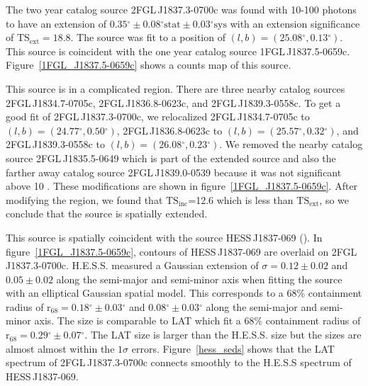\documentclass[12pt,preprint]{aastex}
\newcommand{\gev}{\text{GeV}\xspace}
\newcommand{\tev}{\text{TeV}\xspace}
\newcommand{\tsext}{{\ensuremath{\text{TS}_{\text{ext}}}}\xspace}
\newcommand{\tsinc}{\ensuremath{\text{TS}_{\text{inc}}}\xspace}
\newcommand{\rsixeight}{{\ensuremath{\text{r}_{68}}}\xspace}
\newcommand{\sys}{\text{sys}\xspace}
\newcommand{\stat}{\text{stat}\xspace}
\renewcommand{\deg}{\ensuremath{^\circ}\xspace}
\begin{document}


The two year catalog source 2FGL\,J1837.3-0700c was found 
with 10-100 \gev photons 
to have an extension
of $0.35\deg\pm0.08\deg\stat\pm0.03\deg\sys$ 
with an extension
significance of $\tsext=18.8$.  The source was fit to a position of
$(l,b)=(25.08\deg,0.13\deg)$.  This source is coincident with the one
year catalog source 1FGL\,J1837.5-0659c.  Figure~\ref{1FGL_J1837.5-0659c}
shows a counts map of this source.

This source is in a complicated region. There are three nearby
catalog sources 2FGL\,J1834.7-0705c, 2FGL\,J1836.8-0623c, and
2FGL\,J1839.3-0558c.  To get a good fit of 2FGL\,J1837.3-0700c, we
relocalized 2FGL\,J1834.7-0705c to $(l,b)=(24.77\deg,0.50\deg)$,
2FGL\,J1836.8-0623c to $(l,b)=(25.57\deg,0.32\deg)$, and
2FGL\,J1839.3-0558c to $(l,b)=(26.08\deg,0.23\deg)$.  We removed the
nearby catalog source 2FGL\,J1835.5-0649 which is part of the extended
source and also the farther away catalog source 2FGL\,J1839.0-0539
because it was not significant above 10 \gev. These modifications are
shown in figure~\ref{1FGL_J1837.5-0659c}.  After modifying the region,
we found that \tsinc=12.6 which is less than \tsext, so we conclude that
the source is spatially extended.

This source is spatially coincident with the \tev
source HESS\,J1837-069 (\cite{hess_plane_survey}).  In
figure~\ref{1FGL_J1837.5-0659c}, contours of HESS\,J1837-069
are overlaid on 2FGL\,J1837.3-0700c. H.E.S.S. measured a 
Gaussian extension
of $\sigma=0.12\pm0.02$ and $0.05\pm0.02$ along the semi-major and
semi-minor axis when fitting the source with an elliptical Gaussian
spatial model.  This corresponds to a 68\% containment radius of
$\rsixeight=0.18\deg\pm0.03\deg$ and $0.08\deg\pm0.03\deg$ along the semi-major
and semi-minor axis. The size is comparable to LAT which fit a 68\%
containment radius of $\rsixeight=0.29\deg\pm0.07\deg$.  The LAT size is larger
than the H.E.S.S. size but the sizes are almost almost within the
$1\sigma$ errors. Figure~\ref{hess_seds} shows that the LAT spectrum
of 2FGL\,J1837.3-0700c connects smoothly to the H.E.S.S spectrum of
HESS\,J1837-069.
\end{document}
